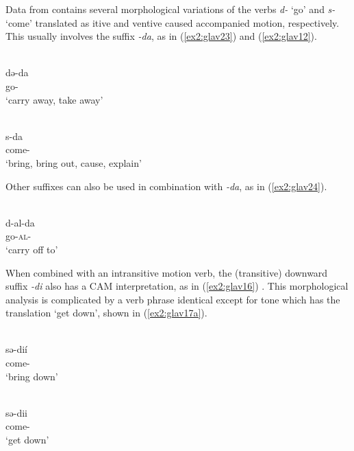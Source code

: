 Data from \citet{owensGlavdaRuralUrban2011} contains several morphological variations of the verbs \textit{d-} `go' and \textit{s-} `come' translated as itive and ventive caused accompanied motion, respectively. This usually involves the suffix \textit{-da}, as in (\ref{ex2:glav23}) and (\ref{ex2:glav12}). 

\ea\label{ex2:glav23}
 \\
\gll də-da \\
go- \\
\glt `carry away, take away'

\ex\label{ex2:glav12}
 \\
\gll s-da \\
come- \\
\glt `bring, bring out, cause, explain'
\z 

Other suffixes can also be used in combination with \textit{-da}, as in (\ref{ex2:glav24}). 

\ea\label{ex2:glav24}
 \\
\gll d-al-da \\
go-\textsc{al}- \\
\glt `carry off to'
\z 

When combined with an intransitive motion verb, the (transitive) downward suffix \textit{-di} also has a CAM interpretation, as in (\ref{ex2:glav16}) \citep[cf.][125]{rappDictionaryGlavdaLanguage1968}. This morphological analysis is complicated by a verb phrase identical except for tone which has the translation `get down', shown in (\ref{ex2:glav17a}). 

\ea\label{ex2:glav16}
 \\
\gll sə-dií	\\
come-		\\
\glt `bring down'

\ex\label{ex2:glav17a}
 \\
\gll sə-dii	\\
come-	\\
\glt `get down'
\z 


